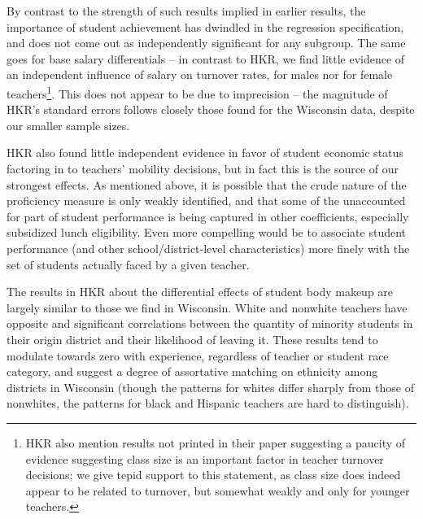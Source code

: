\documentclass[12pt,]{article}
\let\rmarkdownfootnote\footnote%
\def\footnote{\protect\rmarkdownfootnote}
\begin{document}
By contrast to the strength of such results implied in earlier results,
the importance of student achievement has dwindled in the regression
specification, and does not come out as independently significant for
any subgroup. The same goes for base salary differentials -- in contrast
to HKR, we find little evidence of an independent influence of salary on
turnover rates, for males nor for female teachers\footnote{HKR also
  mention results not printed in their paper suggesting a paucity of
  evidence suggesting class size is an important factor in teacher
  turnover decisions; we give tepid support to this statement, as class
  size does indeed appear to be related to turnover, but somewhat weakly
  and only for younger teachers.}. This does not appear to be due to
imprecision -- the magnitude of HKR's standard errors follows closely
those found for the Wisconsin data, despite our smaller sample sizes.

HKR also found little independent evidence in favor of student economic
status factoring in to teachers' mobility decisions, but in fact this is
the source of our strongest effects. As mentioned above, it is possible
that the crude nature of the proficiency measure is only weakly
identified, and that some of the unaccounted for part of student
performance is being captured in other coefficients, especially
subsidized lunch eligibility. Even more compelling would be to associate
student performance (and other school/district-level characteristics)
more finely with the set of students actually faced by a given teacher.

The results in HKR about the differential effects of student body makeup
are largely similar to those we find in Wisconsin. White and nonwhite
teachers have opposite and significant correlations between the quantity
of minority students in their origin district and their likelihood of
leaving it. These results tend to modulate towards zero with experience,
regardless of teacher or student race category, and suggest a degree of
assortative matching on ethnicity among districts in Wisconsin (though
the patterns for whites differ sharply from those of nonwhites, the
patterns for black and Hispanic teachers are hard to distinguish).
\end{document}
